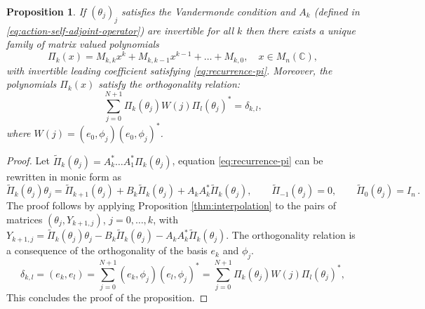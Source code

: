 \documentclass[a4paper,reqno]{amsart}
\newtheorem{proposition}[theorem]{Proposition}
\theoremstyle{definition}
\numberwithin{equation}{section}
\begin{document}
\begin{proposition}
If $(\theta_j)_j$ satisfies the Vandermonde condition and $A_k$ (defined in \eqref{eq:action-self-adjoint-operator}) are invertible for all $k$ then there exists a unique family of matrix valued polynomials 
\begin{equation}
    \Pi_k(x)=M_{k,k}x^k+M_{k,k-1}x^{k-1}+\ldots+M_{k,0},\quad x\in M_n(\mathbb{C}),
\end{equation}
with invertible leading coefficient satisfying \eqref{eq:recurrence-pi}. Moreover, the polynomials $\Pi_k(x)$ satisfy the orthogonality relation:
\begin{equation}
    \sum_{j=0}^{N+1} \Pi_k(\theta_j) W(j) \Pi_l(\theta_j)^*=\delta_{k,l},
\end{equation}
where $W(j)=( e_0, \phi_j)( e_0, \phi_j)^*$.
\end{proposition}
\begin{proof}
Let $\widetilde\Pi_k(\theta_j)=A_{k}^*\ldots A_1^* \Pi_k(\theta_j)$, equation \eqref{eq:recurrence-pi} can be rewritten in monic form as
\begin{equation}
\label{eq:recurrence-monicpi}
\widetilde\Pi_{k}(\theta_j)\theta_j=\widetilde\Pi_{k+1}(\theta_j)+B_k \widetilde\Pi_k(\theta_j)+A_kA_k^* \widetilde\Pi_k(\theta_j), \qquad\widetilde\Pi_{-1}(\theta_j)=0,\qquad \widetilde\Pi_0(\theta_j)=I_n\,.
\end{equation}
The proof follows by applying Proposition \ref{thm:interpolation} to the pairs of matrices $(\theta_j,Y_{k+1,j})$, $j=0,\ldots,k$, with 
$Y_{k+1,j}=\widetilde\Pi_{k}(\theta_j)\theta_j-B_k \widetilde\Pi_k(\theta_j)-A_kA_k^* \widetilde\Pi_k(\theta_j).$ The orthogonality relation is a consequence of the orthogonality of the basis $e_k$ and $\phi_j$.
\begin{equation}
    \delta_{k,l}=( e_k,e_l) =\sum_{j=0}^{N+1} ( e_k,\phi_j) ( e_l,\phi_j)^*=\sum_{j=0}^{N+1} \Pi_k(\theta_j) W(j) \Pi_l(\theta_j)^*,
\end{equation}
This concludes the proof of the proposition.
\end{proof}
\end{document}
